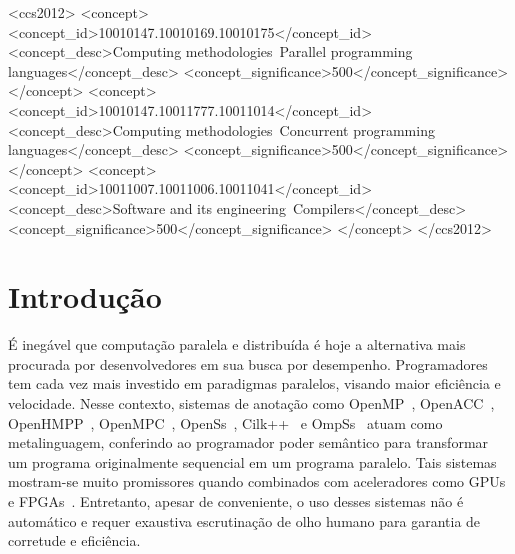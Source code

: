 \documentclass[sigplan,10pt,review]{acmart}
\begin{document}
 \begin{CCSXML}
<ccs2012>
<concept>
<concept_id>10010147.10010169.10010175</concept_id>
<concept_desc>Computing methodologies~Parallel programming languages</concept_desc>
<concept_significance>500</concept_significance>
</concept>
<concept>
<concept_id>10010147.10011777.10011014</concept_id>
<concept_desc>Computing methodologies~Concurrent programming languages</concept_desc>
<concept_significance>500</concept_significance>
</concept>
<concept>
<concept_id>10011007.10011006.10011041</concept_id>
<concept_desc>Software and its engineering~Compilers</concept_desc>
<concept_significance>500</concept_significance>
</concept>
</ccs2012>
\end{CCSXML}



\maketitle

\section{Introdu\c{c}\~{a}o}
\label{sec:intro}

É inegável que computação paralela e distribuída é hoje a alternativa mais procurada por 
desenvolvedores em sua busca por desempenho. Programadores tem cada vez mais investido
em paradigmas paralelos, visando maior eficiência e velocidade. Nesse contexto, sistemas de
anotação como OpenMP~\cite{JaegerCP15},
OpenACC~\cite{OpenACC20}, OpenHMPP~\cite{Andion14}, OpenMPC~\cite{Lee10},
OpenSs~\cite{MeenderinckJ11}, Cilk++~\cite{Leiserson09} e
OmpSs~\cite{bueno:icpp:2011, duran:ppl:2011}
atuam como metalinguagem, conferindo ao programador
poder semântico para transformar um programa originalmente sequencial
em um programa paralelo. Tais sistemas mostram-se muito promissores quando
combinados com aceleradores como GPUs e FPGAs~\cite{Bertolli14,Martineau16,Mendonca17,Poesia17,Reyes12,Antao16,Wienke12}.
Entretanto, apesar de conveniente, o uso desses sistemas não é automático e
requer exaustiva escrutinação de olho humano para garantia de corretude e eficiência.
\end{document}
